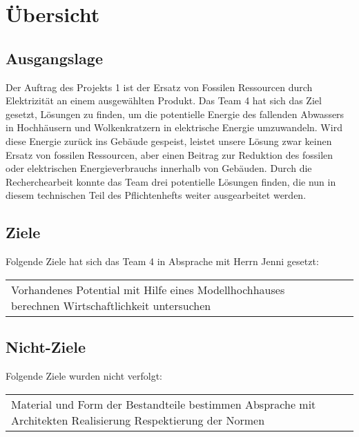 \section{Übersicht} \label{sec:uebersicht}
\subsection{Ausgangslage}
Der Auftrag des Projekts 1 ist der Ersatz von Fossilen Ressourcen durch Elektrizität an einem ausgewählten Produkt. Das Team 4 hat sich das Ziel gesetzt, Lösungen zu finden, um die potentielle Energie des fallenden Abwassers in Hochhäusern und Wolkenkratzern in elektrische Energie umzuwandeln. Wird diese Energie zurück ins Gebäude gespeist, leistet unsere Lösung zwar keinen Ersatz von fossilen Ressourcen, aber einen Beitrag zur Reduktion des fossilen oder elektrischen Energieverbrauchs innerhalb von Gebäuden.
Durch die Recherchearbeit konnte das Team drei potentielle Lösungen finden, die nun in diesem technischen Teil des Pflichtenhefts weiter ausgearbeitet werden.

\subsection{Ziele}
Folgende Ziele hat sich das Team 4 in Absprache mit Herrn Jenni gesetzt:
\begin{table}[H]
\begin{tabular}{lll}
Vorhandenes Potential mit Hilfe eines Modellhochhauses berechnen
Wirtschaftlichkeit untersuchen
\end{tabular}
\end{table}

\subsection{Nicht-Ziele}
Folgende Ziele wurden nicht verfolgt:
\begin{table}[H]
\begin{tabular}{lll}
Material und Form der Bestandteile bestimmen
Absprache mit Architekten
Realisierung
Respektierung der Normen
\end{tabular}
\end{table}
